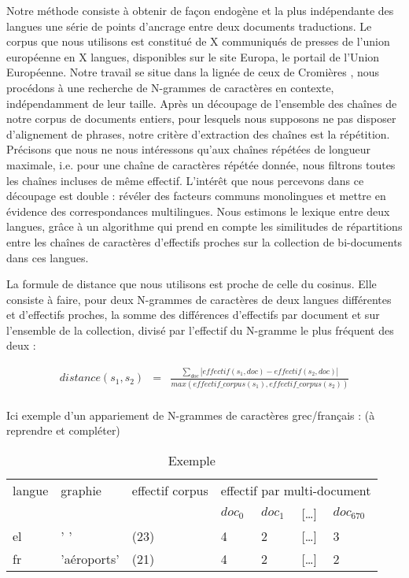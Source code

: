 \documentclass[10pt,a4paper,twoside]{article}
\def\textgreek#1{\leavevmode{\fontfamily{cmr}\greektext #1}}
\begin{document}
Notre méthode consiste à obtenir de façon endogène et la plus indépendante des langues une série de points d'ancrage entre deux documents traductions. Le corpus que nous utilisons est constitué de X communiqués de presses de l'union européenne en X langues, disponibles sur le site Europa, le portail de l'Union Européenne. 
Notre travail se situe dans la lignée de ceux de Cromières \citep{cromieres_sub-sentential_2006}, nous procédons à une recherche de N-grammes de caractères en contexte, indépendamment de leur taille. Après un découpage de l'ensemble des chaînes de notre corpus de documents entiers, pour lesquels nous supposons ne pas disposer d'alignement de phrases, notre critère d'extraction des chaînes est la répétition. Précisons que nous ne nous intéressons qu'aux chaînes répétées de longueur maximale, i.e. pour une chaîne de caractères répétée donnée, nous filtrons toutes les chaînes incluses de même effectif. L'intérêt que nous percevons dans ce découpage est double : révéler des facteurs communs monolingues et mettre en évidence des correspondances multilingues. Nous estimons le lexique entre deux langues, grâce à un algorithme qui prend en compte les similitudes de répartitions entre les chaînes de caractères d'effectifs proches sur la collection de bi-documents dans ces langues.

La formule de distance que nous utilisons est proche de celle du cosinus. Elle consiste à faire, pour deux N-grammes de caractères de deux langues différentes et d'effectifs proches, la somme des différences d'effectifs par document et sur l'ensemble de la collection, divisé par l'effectif du N-gramme le plus fréquent des deux :

\begin{eqnarray*}
  distance(s_1, s_2) & = & 
  \frac{
    \sum_{doc} |effectif(s_1,doc) - effectif(s_2,doc)|
  }{
    max(effectif\_corpus(s_1), effectif\_corpus(s_2))
  } \\
\end{eqnarray*}


Ici exemple d'un appariement de N-grammes de caractères grec/français : (à reprendre et compléter)\\

\begin{table}[!ht]
\begin{center}
\begin{tabular}{|l|l|l|l|l|l|l|}
\hline
  langue & graphie & effectif corpus& \multicolumn{4}{c|}{effectif par multi-document} \\ 
 \cline{4-7}   
    &  & & $doc_0$ & $doc_1$ & [\ldots] & $doc_{670}$ \\
\hline
  el & ' \textgreek{αερολιμέν}' & (23) & 4 & 2 & [\dots] & 3 \\
  fr & 'aéroports'              & (21) & 4 & 2 & [\dots] & 2 \\
\hline
\end{tabular}
  \caption{\label{tab:exemple_log} Exemple}
\end{center}
\end{table}
\end{document}
